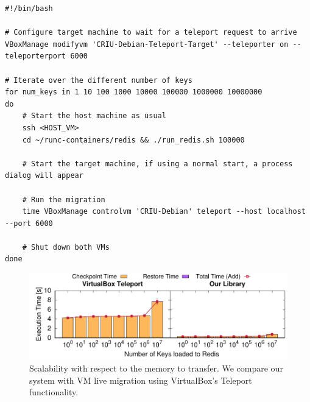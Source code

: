 

\begin{lstlisting}[style=Bash,caption={Script to teleport a VirtualBox VM, and run the macrobenchmark.},label={code:vm-teleport}]
#!/bin/bash

# Configure target machine to wait for a teleport request to arrive
VBoxManage modifyvm 'CRIU-Debian-Teleport-Target' --teleporter on --teleporterport 6000

# Iterate over the different number of keys
for num_keys in 1 10 100 1000 10000 100000 1000000 10000000
do
    # Start the host machine as usual
    ssh <HOST_VM>
    cd ~/runc-containers/redis && ./run_redis.sh 100000

    # Start the target machine, if using a normal start, a process dialog will appear

    # Run the migration
    time VBoxManage controlvm 'CRIU-Debian' teleport --host localhost --port 6000

    # Shut down both VMs
done
\end{lstlisting}

\begin{figure}[h!]
    \centering
    \includegraphics[width=\textwidth]{figs/vm-teleport/vm_teleport.pdf}
    \caption[Scalability comparison with VirtualBox Teleport.]{Scalability with respect to the memory to transfer. We compare our system with VM live migration using VirtualBox's Teleport functionality.\label{fig:vm-teleport}}
\end{figure}

